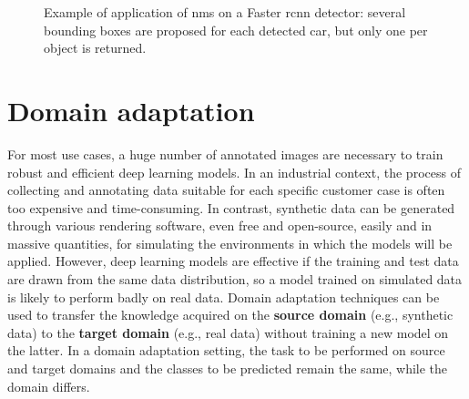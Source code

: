 \documentclass[%
    corpo=12pt,
    twoside,
    stile=classica,   
    tipotesi=magistrale,
    evenboxes,
    english,
	numerazioneromana,
]{toptesi}
\begin{document}
\begin{figure}[tb]
	\centering
	\caption{Example of application of \acrlong{nms} on a Faster \gls{rcnn} detector: several bounding boxes are proposed for each detected car, but only one per object is returned.}
	\label{fig:nms}
\end{figure}


\section{Domain adaptation}
For most use cases, a huge number of annotated images are necessary to train robust and efficient deep learning models. In an industrial context, the process of collecting and annotating data suitable for each specific customer case is often too expensive and time-consuming. In contrast, synthetic data can be generated through various rendering software, even free and open-source, easily and in massive quantities, for simulating the environments in which the models will be applied. However, deep learning models are effective if the training and test data are drawn from the same data distribution, so a model trained on simulated data is likely to perform badly on real data. Domain adaptation techniques can be used to transfer the knowledge acquired on the \textbf{source domain} (e.g., synthetic data) to the \textbf{target domain} (e.g., real data) without training a new model on the latter. In a domain adaptation setting, the task to be performed on source and target domains and the classes to be predicted remain the same, while the domain differs.
\end{document}

